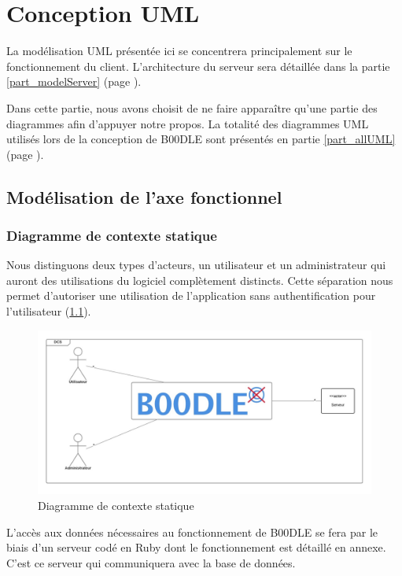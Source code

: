 \documentclass[titlepage]{report}
\begin{document}
\chapter{Conception UML}

La modélisation UML présentée ici se concentrera principalement sur le fonctionnement du client. 
L'architecture du serveur sera détaillée dans la partie \ref{part_modelServer} (page \pageref{part_modelServer}). 
\par Dans cette partie, nous avons choisit de ne faire apparaître qu'une partie des diagrammes afin d'appuyer notre propos. 
La totalité des diagrammes UML utilisés lors de la conception de B00DLE sont présentés en partie \ref{part_allUML} (page \pageref{part_allUML}).

\section{Modélisation de l'axe fonctionnel}

\subsection{Diagramme de contexte statique}

Nous distinguons deux types d'acteurs, un utilisateur et un administrateur qui auront des utilisations du logiciel complètement distincts. 
Cette séparation nous permet d'autoriser une utilisation de l'application sans authentification pour l'utilisateur (\ref{diagramme_contexteStatique}). 

\begin{figure}[h]
	\caption{Diagramme de contexte statique}
	\label{diagramme_contexteStatique}
	\centering
	\includegraphics[scale=0.7]{figures/diagrammes/contexteStatique.png}
\end{figure}

L'accès aux données nécessaires au fonctionnement de B00DLE se fera par le biais d'un serveur codé en Ruby dont le fonctionnement est détaillé en annexe. C'est ce serveur qui communiquera avec la base de données.
\end{document}
